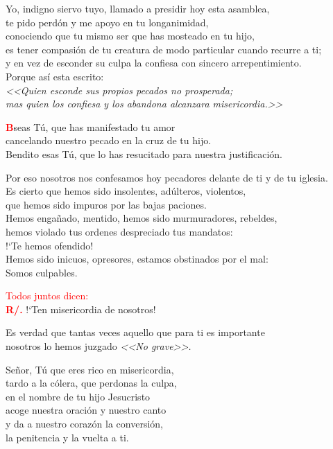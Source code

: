 \documentclass[12pt, letterpaper]{report}
\begin{document}
\noindent
\Large {Yo, indigno siervo tuyo, llamado a presidir hoy esta asamblea,\\
te pido perd\'on y me apoyo en tu longanimidad,\\
conociendo que tu mismo ser que has mosteado en tu hijo,\\
es tener compasi\'on de tu creatura de modo particular cuando recurre a ti;\\
y en vez de esconder su culpa la confiesa con sincero arrepentimiento.\\
Porque as\'i esta escrito:\\
\em <<Quien esconde sus propios pecados no prosperada;\\
mas quien los confiesa y los abandona alcanzara misericordia.>>
}

\lettrine[lines=2]{\bfseries \textcolor{red}{B}}{}\Large {seas T\'u, que has manifestado tu amor\\
cancelando nuestro pecado en la cruz de tu hijo.\\
Bendito esas T\'u, que lo has resucitado para nuestra justificaci\'on.}

\noindent
\Large {Por eso nosotros nos confesamos hoy pecadores delante de ti y de tu iglesia.\\
Es cierto que hemos sido insolentes, ad\'ulteros, violentos,\\
que hemos sido impuros por las bajas paciones.\\
Hemos enga\~nado, mentido, hemos sido murmuradores, rebeldes,\\
hemos violado tus ordenes despreciado tus mandatos:\\
!`Te hemos ofendido!\\
Hemos sido inicuos, opresores, estamos obstinados por el mal:\\
Somos culpables.}

\large {\textcolor{red}{Todos juntos dicen:}}\\
\noindent
\Large {\bfseries \textcolor{red}{R/.}} \hspace{0.5cm} !`Ten misericordia de nosotros!

\noindent
\Large {Es verdad que tantas veces aquello que para ti es importante\\
nosotros lo hemos juzgado \em <<No grave>>.}

\noindent
\Large {Se\~nor, T\'u que eres rico en misericordia,\\
tardo a la c\'olera, que perdonas la culpa,\\
en el nombre de tu hijo Jesucristo\\
acoge nuestra oraci\'on y nuestro canto\\
y da a nuestro coraz\'on la conversi\'on,\\
la penitencia y la vuelta a ti.}
\end{document}

